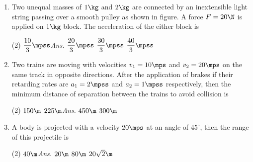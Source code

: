 \documentclass{article}
\newcommand{\ans}{\textcolor{red!95}{\textit{\quad Ans.}}}
\begin{document}
\begin{enumerate}
\item Two unequal masses of $1 \kg$ and $2 \kg$ are connected by an inextensible light string passing over a smooth pulley as shown in figure. A force $F = 20 \N$ is applied on $1 \kg$ block. The acceleration of the either block is 
\begin{center}
\end{center} 
\begin{tasks}(2)
	\task $\dfrac{10}{3}\mpss$\ans
	\task $\dfrac{20}{3}\mpss$
	\task $\dfrac{30}{3}\mpss$
	\task $\dfrac{40}{3}\mpss$
\end{tasks}


\item Two trains are moving with velocities $v_1=10\mps$ and $v_2=20\mps$ on the same track in opposite directions. After the application of brakes if their retarding rates are $a_1=2\mpss$ and $a_2=1\mpss$ respectively, then the minimum distance of separation between the trains to avoid collision is
\begin{tasks}(2)
    \task $150\m$
    \task $225\m$\ans
    \task $450\m$
    \task $300\m$
\end{tasks}

\item A body is projected with a velocity $20\mps$ at an angle of  $45^\circ$, then the range of this projectile is
\begin{center}
\end{center}
\begin{tasks}(2)
    \task $40\m$\ans
    \task $20\m$
    \task $80\m$
    \task $20\sqrt{2}\m$
\end{tasks}


\end{enumerate}
\end{document}
